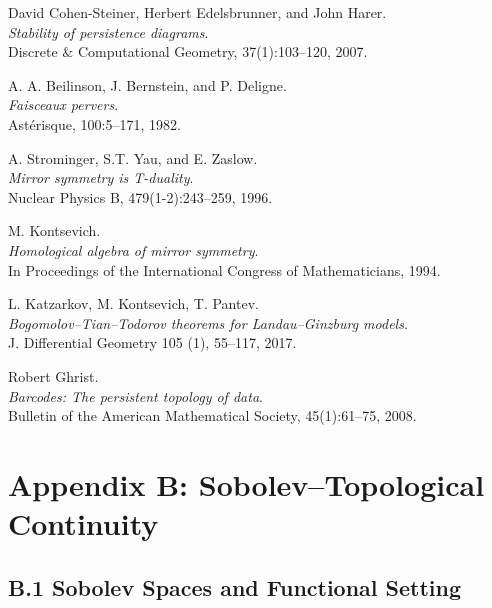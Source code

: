 \documentclass[11pt]{article}
\begin{document}
\begin{thebibliography}{9}

David Cohen-Steiner, Herbert Edelsbrunner, and John Harer.\\
\textit{Stability of persistence diagrams}.\\
Discrete \& Computational Geometry, 37(1):103--120, 2007.

A. A. Beilinson, J. Bernstein, and P. Deligne.\\
\textit{Faisceaux pervers}.\\
Ast\'erisque, 100:5–171, 1982.

A. Strominger, S.T. Yau, and E. Zaslow.\\
\textit{Mirror symmetry is T-duality}.\\
Nuclear Physics B, 479(1-2):243–259, 1996.

M. Kontsevich.\\
\textit{Homological algebra of mirror symmetry}.\\
In Proceedings of the International Congress of Mathematicians, 1994.

L. Katzarkov, M. Kontsevich, T. Pantev.\\
\textit{Bogomolov–Tian–Todorov theorems for Landau–Ginzburg models}.\\
J. Differential Geometry 105 (1), 55–117, 2017.

Robert Ghrist.\\
\textit{Barcodes: The persistent topology of data}.\\
Bulletin of the American Mathematical Society, 45(1):61--75, 2008.

\end{thebibliography}



\section*{Appendix B: Sobolev–Topological Continuity}

\subsection*{B.1 Sobolev Spaces and Functional Setting}
\end{document}
